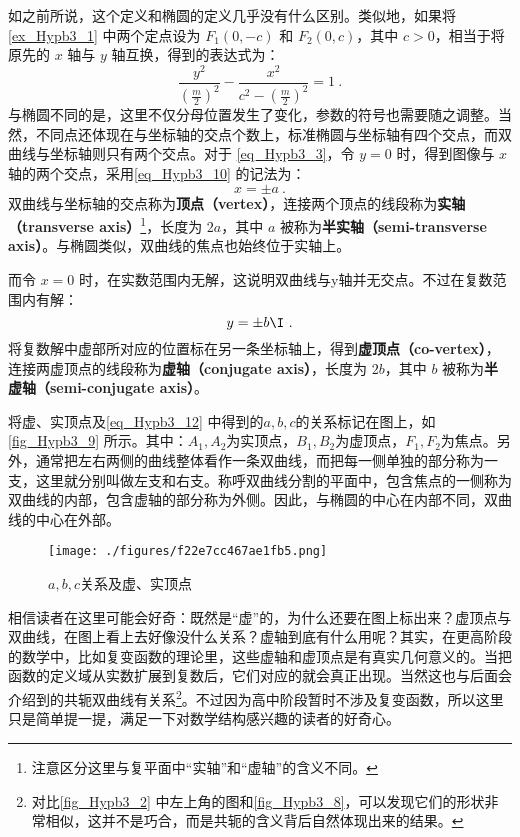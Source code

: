如之前所说，这个定义和椭圆的定义几乎没有什么区别。类似地，如果将 \autoref{ex_Hypb3_1} 中两个定点设为 $F_1(0,-c)$ 和 $F_2(0,c)$，其中 $c>0$，相当于将原先的 $x$ 轴与 $y$ 轴互换，得到的表达式为：
\begin{equation}\label{eq_Hypb3_7}
\frac{y^2}{\left(\displaystyle\frac{m}{2}\right)^2}-\frac{x^2}{\displaystyle c^2-\left(\frac{m}{2}\right)^2} =1~.
\end{equation}
与椭圆不同的是，这里不仅分母位置发生了变化，参数的符号也需要随之调整。当然，不同点还体现在与坐标轴的交点个数上，标准椭圆与坐标轴有四个交点，而双曲线与坐标轴则只有两个交点。对于 \autoref{eq_Hypb3_3}，令 $y=0$ 时，得到图像与 $x$ 轴的两个交点，采用\autoref{eq_Hypb3_10} 的记法为：
\begin{equation}
x = \pm a~.
\end{equation}
双曲线与坐标轴的交点称为\textbf{顶点（vertex）}，连接两个顶点的线段称为\textbf{实轴（transverse axis）}\footnote{注意区分这里与复平面中“实轴”和“虚轴”的含义不同。}，长度为 $2a$，其中 $a$ 被称为\textbf{半实轴（semi-transverse axis）}。与椭圆类似，双曲线的焦点也始终位于实轴上。

而令 $x=0$ 时，在实数范围内无解，这说明双曲线与y轴并无交点。不过在复数范围内有解：
\begin{equation}
y = \pm  b\I~.
\end{equation}
将复数解中虚部所对应的位置标在另一条坐标轴上，得到\textbf{虚顶点（co-vertex）}，连接两虚顶点的线段称为\textbf{虚轴（conjugate axis）}，长度为 $2b$，其中 $b$ 被称为\textbf{半虚轴（semi-conjugate axis）}。

将虚、实顶点及\autoref{eq_Hypb3_12} 中得到的$a,b,c$的关系标记在图上，如\autoref{fig_Hypb3_9} 所示。其中：$A_1,A_2$为实顶点，$B_1,B_2$为虚顶点，$F_1,F_2$为焦点。另外，通常把左右两侧的曲线整体看作一条双曲线，而把每一侧单独的部分称为一支，这里就分别叫做左支和右支。称呼双曲线分割的平面中，包含焦点的一侧称为双曲线的内部，包含虚轴的部分称为外侧。因此，与椭圆的中心在内部不同，双曲线的中心在外部。

\begin{figure}[ht]
\centering
\texttt{[image: ./figures/f22e7cc467ae1fb5.png]}
\caption{$a,b,c$关系及虚、实顶点} \label{fig_Hypb3_9}
\end{figure}

相信读者在这里可能会好奇：既然是“虚”的，为什么还要在图上标出来？虚顶点与双曲线，在图上看上去好像没什么关系？虚轴到底有什么用呢？其实，在更高阶段的数学中，比如复变函数的理论里，这些虚轴和虚顶点是有真实几何意义的。当把函数的定义域从实数扩展到复数后，它们对应的就会真正出现。当然这也与后面会介绍到的共轭双曲线有关系\footnote{对比\autoref{fig_Hypb3_2} 中左上角的图和\autoref{fig_Hypb3_8}，可以发现它们的形状非常相似，这并不是巧合，而是共轭的含义背后自然体现出来的结果。}。不过因为高中阶段暂时不涉及复变函数，所以这里只是简单提一提，满足一下对数学结构感兴趣的读者的好奇心。

